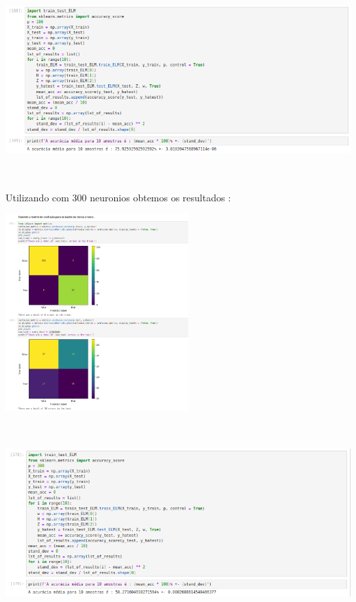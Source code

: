 \documentclass{article}
\begin{document}
\begin{center}
\begin{center}
\includegraphics[height=3in]{Ex6/Hearth_Disease/acc_100.png}
\vspace{10pt}

\end{center}



\vspace{5pt}
Utilizando com 300 neuronios obtemos os resultados : 

\begin{center}

\includegraphics[height=3in]{Ex6/Hearth_Disease/conf_mat_300.png}
\vspace{10pt}

\end{center}

\begin{center}

\includegraphics[height=3in]{Ex6/Hearth_Disease/acc_300.png}
\vspace{10pt}


\end{center}
\end{center}
\end{document}
